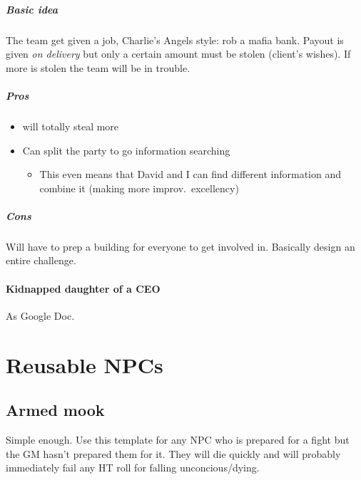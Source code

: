 \paragraph{Basic idea}

The team get given a job, Charlie's Angels style: rob a mafia bank. Payout is
given \emph{on delivery} but only a certain amount must be stolen (client's
wishes). If more is stolen the team will be in trouble.

\paragraph{Pros}

\begin{itemize}
\item {} will totally steal more
\item Can split the party to go information searching
  \begin{itemize}
  \item This even means that David and I can find different information and
    combine it (making more improv.\ excellency)
  \end{itemize}
\end{itemize}

\paragraph{Cons}

Will have to prep a building for everyone to get involved in. Basically design
an entire challenge.

\subsubsection{Kidnapped daughter of a CEO}
\label{sec:kidn-daught-ceo}

As Google Doc.


\chapter{Reusable NPCs}
\label{cha:reusable-npcs}

\section{Armed mook}
\label{sec:armed-mook}

Simple enough. Use this template for any NPC who is prepared for a fight but
the GM hasn't prepared them for it. They will die quickly and will probably
immediately fail any HT roll for falling unconcious/dying.

